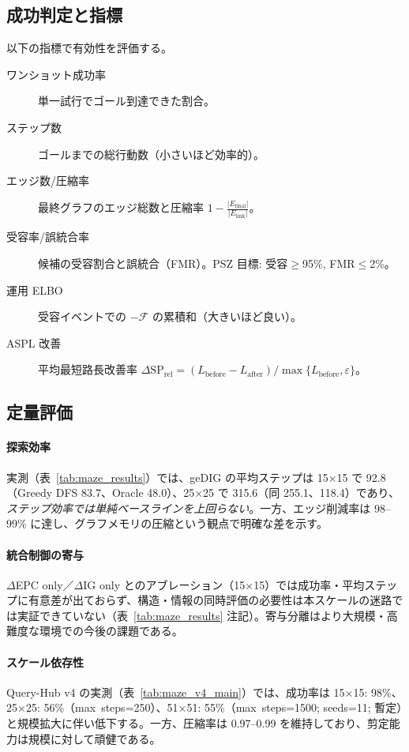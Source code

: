 \documentclass[ja=standard,xelatex]{bxjsarticle}
\newcommand{\F}{\mathcal{F}}
\begin{document}
\subsection{成功判定と指標}
\label{sec:maze_success_metrics}
以下の指標で有効性を評価する。
\begin{description}
  \item[ワンショット成功率] 単一試行でゴール到達できた割合。
  \item[ステップ数] ゴールまでの総行動数（小さいほど効率的）。
  \item[エッジ数/圧縮率] 最終グラフのエッジ総数と圧縮率 $1-\frac{|E_{\mathrm{final}}|}{|E_{\mathrm{link}}|}$。
  \item[受容率/誤統合率] 候補の受容割合と誤統合（FMR）。PSZ 目標: 受容$\ge$95\%, FMR$\le$2\%。
  \item[運用 ELBO] 受容イベントでの $-\F$ の累積和（大きいほど良い）。
  \item[ASPL 改善] 平均最短路長改善率 $\Delta\mathrm{SP}_{\mathrm{rel}}=(L_{\mathrm{before}}-L_{\mathrm{after}})/\max\{L_{\mathrm{before}},\varepsilon\}$。
\end{description}

\subsection{定量評価}

\paragraph{探索効率}
実測（表~\ref{tab:maze_results}）では、geDIG の平均ステップは 15×15 で 92.8（Greedy DFS 83.7、Oracle 48.0）、25×25 で 315.6（同 255.1、118.4）であり、\emph{ステップ効率では単純ベースラインを上回らない}。一方、エッジ削減率は 98--99\% に達し、グラフメモリの圧縮という観点で明確な差を示す。

\paragraph{統合制御の寄与}
$\Delta$EPC only／$\Delta$IG only とのアブレーション（15×15）では成功率・平均ステップに有意差が出ておらず、構造・情報の同時評価の必要性は本スケールの迷路では実証できていない（表~\ref{tab:maze_results} 注記）。寄与分離はより大規模・高難度な環境での今後の課題である。

\paragraph{スケール依存性}
Query-Hub v4 の実測（表~\ref{tab:maze_v4_main}）では、成功率は 15×15: 98\%、25×25: 56\%（max~steps=250）、51×51: 55\%（max~steps=1500; seeds=11; 暫定）と規模拡大に伴い低下する。一方、圧縮率は 0.97--0.99 を維持しており、剪定能力は規模に対して頑健である。
\end{document}
